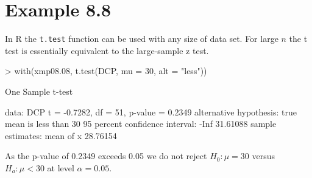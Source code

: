 \documentclass{book}
\begin{document}
\section{Example 8.8}
\label{sec:xmp0808}

In R the \texttt{t.test} function can be used with any size of data
set.  For large $n$ the t test is essentially equivalent to the
large-sample z test.
\begin{Schunk}
\begin{Sinput}
> with(xmp08.08, t.test(DCP, mu = 30, alt = "less"))
\end{Sinput}
\begin{Soutput}
	One Sample t-test

data:  DCP 
t = -0.7282, df = 51, p-value = 0.2349
alternative hypothesis: true mean is less than 30 
95 percent confidence interval:
     -Inf 31.61088 
sample estimates:
mean of x 
 28.76154 
\end{Soutput}
\end{Schunk}

As the p-value of 0.2349 exceeds 0.05 we do not reject $H_0:\mu=30$
versus $H_a:\mu < 30$ at level $\alpha=0.05$.
\end{document}
